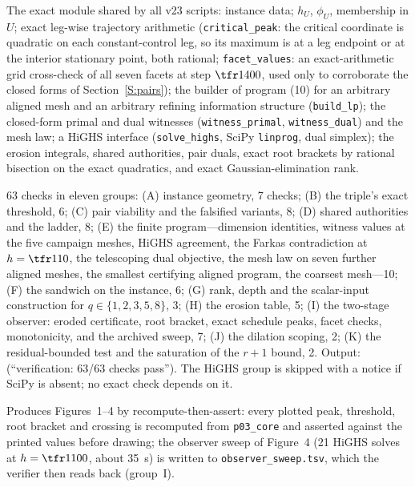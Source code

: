 \begin{description}[leftmargin=1.5em,itemsep=2pt]
\item[\texttt{p03\_core.py}] The exact module shared by all v23 scripts: instance data; $h_U$, $\phi_U$, membership in $U$; exact leg-wise trajectory arithmetic (\texttt{critical\_peak}: the critical coordinate is quadratic on each constant-control leg, so its maximum is at a leg endpoint or at the interior stationary point, both rational; \texttt{facet\_values}: an exact-arithmetic grid cross-check of all seven facets at step $\tfr1{400}$, used only to corroborate the closed forms of Section~\ref{S:pairs}); the builder of program (10) for an arbitrary aligned mesh and an arbitrary refining information structure (\texttt{build\_lp}); the closed-form primal and dual witnesses (\texttt{witness\_primal}, \texttt{witness\_dual}) and the mesh law; a HiGHS interface (\texttt{solve\_highs}, SciPy \texttt{linprog}, dual simplex); the erosion integrals, shared authorities, pair duals, exact root brackets by rational bisection on the exact quadratics, and exact Gaussian-elimination rank.
\item[\texttt{paper03\_computational\_certification\_v23\_verification.py}] 63 checks in eleven groups: (A) instance geometry, 7 checks; (B) the triple's exact threshold, 6; (C) pair viability and the falsified variants, 8; (D) shared authorities and the ladder, 8; (E) the finite program---dimension identities, witness values at the five campaign meshes, HiGHS agreement, the Farkas contradiction at $h=\tfr1{10}$, the telescoping dual objective, the mesh law on seven further aligned meshes, the smallest certifying aligned program, the coarsest mesh---10; (F) the sandwich on the instance, 6; (G) rank, depth and the scalar-input construction for $q\in\{1,2,3,5,8\}$, 3; (H) the erosion table, 5; (I) the two-stage observer: eroded certificate, root bracket, exact schedule peaks, facet checks, monotonicity, and the archived sweep, 7; (J) the dilation scoping, 2; (K) the residual-bounded test and the saturation of the $r+1$ bound, 2. Output:  (``verification: 63/63 checks pass''). The HiGHS group is skipped with a notice if SciPy is absent; no exact check depends on it.
\item[\texttt{make\_figs.py}] Produces Figures~1--4 by recompute-then-assert: every plotted peak, threshold, root bracket and crossing is recomputed from \texttt{p03\_core} and asserted against the printed values before drawing; the observer sweep of Figure~4 (21 HiGHS solves at $h=\tfr1{100}$, about 35~s) is written to \texttt{observer\_sweep.tsv}, which the verifier then reads back (group~I).

\end{description}
